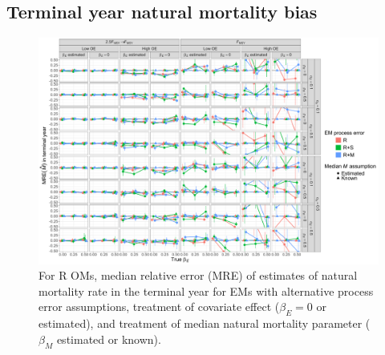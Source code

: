 \documentclass[
  12pt,
]{article}
\begin{document}
\hypertarget{terminal-year-natural-mortality-bias}{%
\subsection*{Terminal year natural mortality bias}\label{terminal-year-natural-mortality-bias}}

\begin{landscape}
\begin{figure}
\begin{center}
\includegraphics[height = \textheight]{terminal_year_M_bias_Rom}
\end{center}
\caption{For R OMs, median relative error (MRE) of estimates of natural mortality rate in the terminal year for EMs with alternative process error assumptions, treatment of covariate effect ($\beta_E = 0$ or estimated), and treatment of median natural mortality parameter ($\beta_M$ estimated or known).}\label{terminal_M_bias_Rom}
\end{figure}
\end{landscape}
\end{document}
